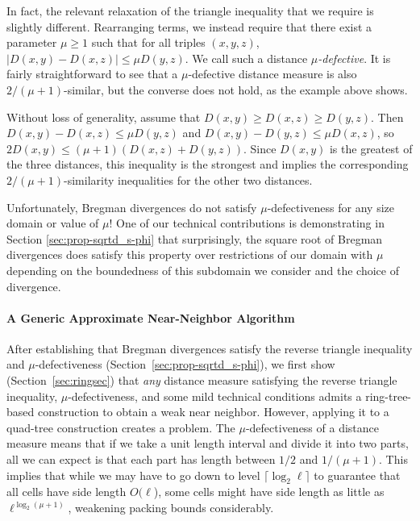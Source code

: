 \documentclass[11pt]{myclass}
\begin{document}
In fact, the relevant relaxation of the triangle inequality that we require is slightly different. Rearranging terms, we instead require that there exist 
a parameter $\mu \ge 1$ such that for all triples $(x,y,z)$, $|D(x,y) - D(x,z)| \le \mu D(y,z)$. We call such a distance \emph{$\mu$-defective}. 
It is fairly straightforward to see that a $\mu$-defective distance measure is also $2/(\mu+1)$-similar, but the converse does not hold, 
as the example above shows.

Without loss of generality, assume that $D(x,y) \geq D(x,z) \geq D(y,z)$.  Then $D(x,y) - D(x,z) \le \mu D(y,z)$ and $D(x,y) - D(y,z) \le \mu D(x,z)$, 
so $2D(x,y) \le (\mu+1)( D(x,z)+D(y,z))$. Since $D(x,y)$ is the greatest of the three distances, this inequality is the strongest and implies 
the corresponding $2/(\mu+1)$-similarity inequalities for the other two distances.

Unfortunately, Bregman divergences do not satisfy $\mu$-defectiveness for any size domain or value of $\mu$! One of our
technical contributions is demonstrating in Section \ref{sec:prop-sqrtd_s-phi} that surprisingly, the square root of Bregman divergences
does satisfy this property over restrictions of our domain with $\mu$ depending on the boundedness of this subdomain we consider and the choice of divergence.

\paragraph{A Generic Approximate Near-Neighbor Algorithm}

After establishing that Bregman divergences satisfy the reverse triangle inequality and $\mu$-defectiveness (Section~\ref{sec:prop-sqrtd_s-phi}),
 we first show (Section~\ref{sec:ringsec}) that \emph{any} distance measure satisfying 
the reverse triangle inequality, $\mu$-defectiveness, and some mild technical conditions admits a ring-tree-based construction 
to obtain a weak near neighbor. However, applying it to a quad-tree construction creates a problem. 
The $\mu$-defectiveness of a distance measure means that if we take a unit length interval and divide it into two parts, 
all we can expect is that each part has length between $1/2$ and $1/(\mu+1)$. This implies that while we may have 
to go down to level $\lceil \log_2 \ell\rceil$ to guarantee that all cells have side length $O(\ell$), some cells 
might have side length as little as $\ell^{\log_2 (\mu+1)}$, weakening packing bounds considerably. 
\end{document}
